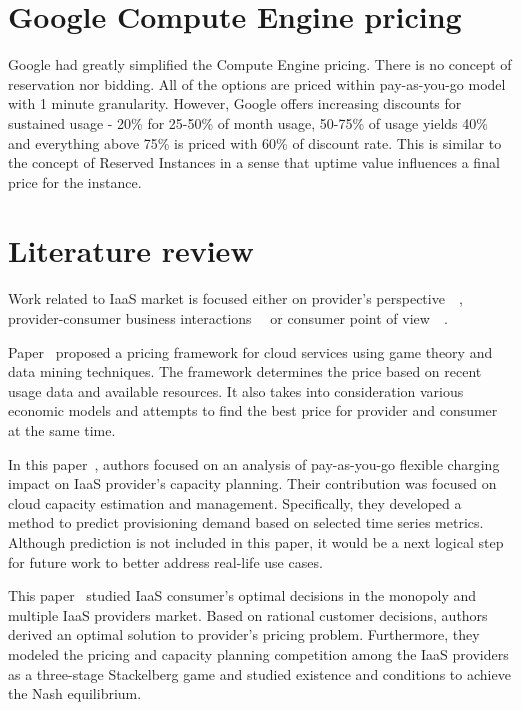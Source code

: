 \documentclass[]{final_report}
\begin{document}
\section{Google Compute Engine pricing}

Google had greatly simplified the Compute Engine pricing. There is no concept of reservation nor bidding. All of the options are priced within pay-as-you-go model with 1 minute granularity. However, Google offers increasing discounts for sustained usage - 20\% for 25-50\% of month usage, 50-75\% of usage yields 40\% and everything above 75\% is priced with 60\% of discount rate. This is similar to the concept of Reserved Instances in a sense that uptime value influences a final price for the instance.

\section{Literature review}

Work related to IaaS market is focused either on provider's perspective~\cite{6274129}~\cite{6253563}, provider-consumer business interactions~\cite{6676685}~\cite{6963393} or consumer point of view~\cite{5961733}~\cite{6295066}. 

Paper~\cite{6253563} proposed a pricing framework for cloud services using game theory and data mining techniques. The framework determines the price based on recent usage data and available resources. It also takes into consideration various economic models and attempts to find the best price for provider and consumer at the same time.

In this paper~\cite{6274129}, authors focused on an analysis of pay-as-you-go flexible charging impact on IaaS provider's capacity planning. Their contribution was focused on cloud capacity estimation and management. Specifically, they developed a method to predict provisioning demand based on selected time series metrics. 
Although prediction is not included in this paper, it would be a next logical step for future work to better address real-life use cases. 

This paper~\cite{6963393} studied IaaS consumer's optimal decisions in the monopoly and multiple IaaS providers market. Based on rational customer decisions, authors derived an optimal solution to provider's pricing problem. Furthermore, they modeled the pricing and capacity planning competition among the IaaS providers as a three-stage Stackelberg game and studied existence and conditions to achieve the Nash equilibrium. 
\end{document}
